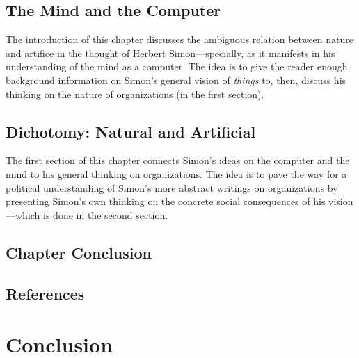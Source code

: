 \documentclass[version=last,draft=false,paper=A4,portrait,twoside=true,twocolumn=true,headinclude=false,footinclude=false,fontsize=12,BCOR=20mm,DIV=13,pagesize=auto,titlepage=firstiscover,mpinclude=false,open=right,chapterprefix=true,numbers=autoendperiod,headsepline=false,parskip=false]{scrbook}
\begin{document}
\section{The Mind and the Computer}
\label{sec:org3df1308}
The introduction of this chapter discusses the ambiguous relation between
nature and artifice in the thought of Herbert Simon---specially, as it
manifests in his understanding of the mind as a computer. The idea is to
give the reader enough background information on Simon's general vision of
\emph{things} to, then, discuss his thinking on the nature of organizations (in
the first section).

\section{Dichotomy: Natural and Artificial}
\label{sec:orgb384767}
The first section of this chapter connects Simon's ideas on the computer
and the mind to his general thinking on organizations. The idea is to pave
the way for a political understanding of Simon's more abstract writings on
organizations by presenting Simon's own thinking on the concrete social
consequences of his vision---which is done in the second section.

\section{Chapter Conclusion}
\label{sec:org924af29}
\section*{References}
\printbibliography[heading=none,keyword=chapter-3]
\chapter{Conclusion}
\label{sec:org7d7f184}
\end{document}
